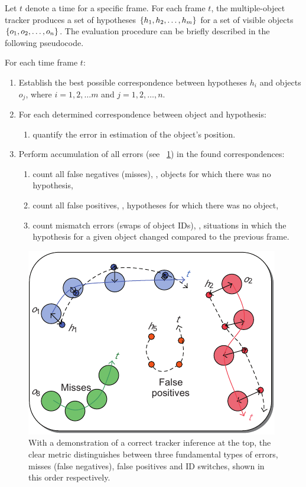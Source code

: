 Let $t$ denote a time for a specific frame. For each frame $t$, the multiple-object tracker produces a set of hypotheses $\left\{ {h_1, h_2, \dots, h_m} \right\}$ for a set of visible objects $\left\{ {o_1, o_2, \dots, o_n} \right\}$. The evaluation procedure can be briefly described in the following pseudocode.

For each time frame $t$:
\begin{enumerate}
    \item Establish the best possible correspondence between hypotheses $h_i$ and objects $o_j$, where $i = 1, 2, \dots m$ and $j = 1, 2, \dots, n$.
    \item For each determined correspondence between object and hypothesis:
          \begin{enumerate}
              \item quantify the error in estimation of the object's position.
          \end{enumerate}
    \item Perform accumulation of all errors (see \figtext{}~\ref{fig:CLEARHypotheses}) in the found correspondences:
          \begin{enumerate}
              \item count all false negatives (misses), \ietext{}, objects for which there was no hypothesis,
              \item count all false positives, \ietext{}, hypotheses for which there was no object,
              \item count mismatch errors (swaps of object IDs), \ietext{}, situations in which the hypothesis for a given object changed compared to the previous frame.
          \end{enumerate}
\end{enumerate}

\begin{figure}[t]
    \centerline{\includegraphics[width=0.55\linewidth]{figures/theoretical_foundations/clear_hypotheses_status.pdf}}
    \caption[\gls{clear} hypotheses]{With a demonstration of a correct tracker inference at the top, the \gls{clear} metric distinguishes between three fundamental types of errors, misses (false negatives), false positives and ID switches, shown in this order respectively. }
    \label{fig:CLEARHypotheses}
\end{figure}

